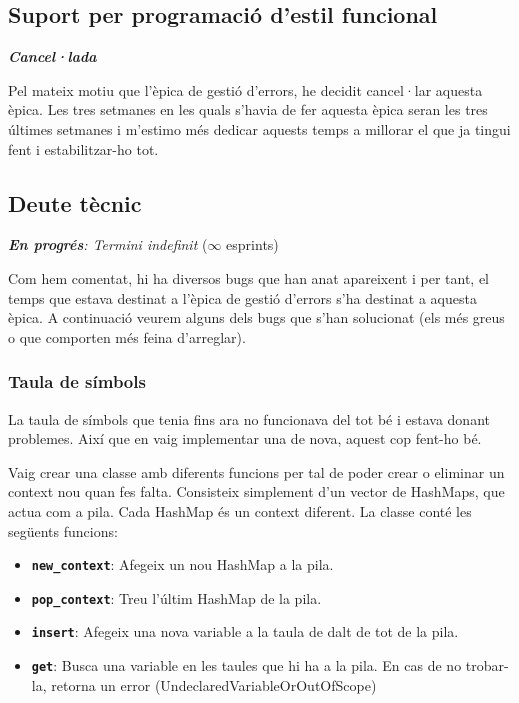 ﻿\documentclass{article}
\begin{document}
\subsection{Suport per programació d'estil funcional}
\textit{\textbf{Cancel·lada}}

Pel mateix motiu que l'èpica de gestió d'errors, he decidit cancel·lar aquesta
èpica. Les tres setmanes en les quals s'havia de fer aquesta èpica seran les
tres últimes setmanes i m'estimo més dedicar aquests temps a millorar el que ja
tingui fent i estabilitzar-ho tot.

\subsection{Deute tècnic}
\textit{\textbf{En progrés}: Termini indefinit} ($\infty$ esprints)

Com hem comentat, hi ha diversos bugs que han anat apareixent i per tant, el
temps que estava destinat a l'èpica de gestió d'errors s'ha destinat a aquesta
èpica. A continuació veurem alguns dels bugs que s'han solucionat (els més
greus o que comporten més feina d'arreglar).

\subsubsection{Taula de símbols}

La taula de símbols que tenia fins ara no funcionava del tot bé i estava donant
problemes. Així que en vaig implementar una de nova, aquest cop fent-ho bé.

Vaig crear una classe amb diferents funcions per tal de poder crear o eliminar
un context nou quan fes falta. Consisteix simplement d'un vector de HashMaps,
que actua com a pila. Cada HashMap és un context diferent. La classe conté les
següents funcions:

\begin{itemize}
    \item \texttt{\textbf{new\_context}}: Afegeix un nou HashMap a la pila.
    \item \texttt{\textbf{pop\_context}}: Treu l'últim HashMap de la pila.
    \item \texttt{\textbf{insert}}: Afegeix una nova variable a la taula de dalt
    de tot de la pila.
    \item \texttt{\textbf{get}}: Busca una variable en les taules que hi ha a la
    pila. En cas de no trobar-la, retorna un error (UndeclaredVariableOrOutOfScope)
\end{itemize}
\end{document}
